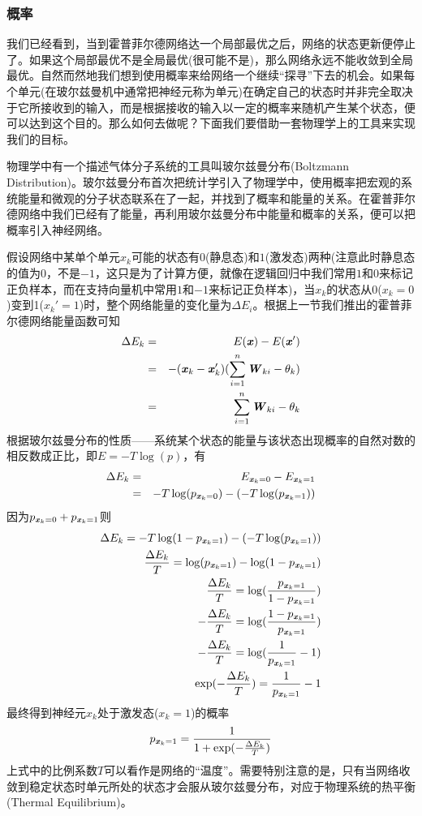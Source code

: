 \subsubsection{概率}
我们已经看到，当到霍普菲尔德网络达一个局部最优之后，网络的状态更新便停止了。如果这个局部最优不是全局最优(很可能不是)，那么网络永远不能收敛到全局最优。自然而然地我们想到使用概率来给网络一个继续“探寻”下去的机会。如果每个单元(在玻尔兹曼机中通常把神经元称为单元)在确定自己的状态时并非完全取决于它所接收到的输入，而是根据接收的输入以一定的概率来随机产生某个状态，便可以达到这个目的。那么如何去做呢？下面我们要借助一套物理学上的工具来实现我们的目标。

物理学中有一个描述气体分子系统的工具叫玻尔兹曼分布(Boltzmann Distribution)。玻尔兹曼分布首次把统计学引入了物理学中，使用概率把宏观的系统能量和微观的分子状态联系在了一起，并找到了概率和能量的关系。在霍普菲尔德网络中我们已经有了能量，再利用玻尔兹曼分布中能量和概率的关系，便可以把概率引入神经网络。

假设网络中某单个单元$x_{k}$可能的状态有$0$(静息态)和$1$(激发态)两种(注意此时静息态的值为$0$，不是$-1$，这只是为了计算方便，就像在逻辑回归中我们常用$1$和$0$来标记正负样本，而在支持向量机中常用$1$和$-1$来标记正负样本)，当$x_{k}$的状态从0($x_{k}=0$)变到1($x_{k}'=1$)时，整个网络能量的变化量为$\Delta E_{i}$。根据上一节我们推出的霍普菲尔德网络能量函数可知
\begin{eqnarray}
\Delta E_{k} 
&=& E(\boldsymbol{\mathit{x}}) - E(\boldsymbol{\mathit{x}}') \nonumber\\
&=& -(\boldsymbol{\mathit{x}}_{k} - \boldsymbol{\mathit{x}}_{k}')(\sum_{i=1}^{n}\boldsymbol{\mathit{W}}_{ki} - \theta_{k}) \nonumber\\
&=& \sum_{i=1}^{n}\boldsymbol{\mathit{W}}_{ki} - \theta_{k}
\end{eqnarray}
根据玻尔兹曼分布的性质——系统某个状态的能量与该状态出现概率的自然对数的相反数成正比，即$E=-T\log(p)$，有
\begin{eqnarray}
\Delta E_{k} 
&=& E_{\boldsymbol{\mathit{x}}_{k}=0} - E_{\boldsymbol{\mathit{x}}_{k}=1} \nonumber\\
&=& -T\log (p_{\boldsymbol{\mathit{x}}_{k}=0}) - (-T\log (p_{\boldsymbol{\mathit{x}}_{k}=1}))\nonumber
\end{eqnarray}
因为$p_{\boldsymbol{\mathit{x}}_{k}=0}+p_{\boldsymbol{\mathit{x}}_{k}=1}$则
\begin{eqnarray}
\Delta E_{k} = -T\log (1-p_{\boldsymbol{\mathit{x}}_{k}=1}) - (-T\log (p_{\boldsymbol{\mathit{x}}_{k}=1}))\nonumber \\
\frac{\Delta E_{k}}{T} = \log (p_{\boldsymbol{\mathit{x}}_{k}=1}) - \log (1-p_{\boldsymbol{\mathit{x}}_{k}=1})\nonumber \\
\frac{\Delta E_{k}}{T} = \log (\frac{p_{\boldsymbol{\mathit{x}}_{k}=1}}{1-p_{\boldsymbol{\mathit{x}}_{k}=1}})\nonumber \\
-\frac{\Delta E_{k}}{T} = \log (\frac{1-p_{\boldsymbol{\mathit{x}}_{k}=1}}{p_{\boldsymbol{\mathit{x}}_{k}=1}})\nonumber \\
-\frac{\Delta E_{k}}{T} = \log (\frac{1}{p_{\boldsymbol{\mathit{x}}_{k}=1}}-1)\nonumber \\
\exp(-\frac{\Delta E_{k}}{T}) = \frac{1}{p_{\boldsymbol{\mathit{x}}_{k}=1}}-1\nonumber \\
\end{eqnarray}
最终得到神经元$x_{k}$处于激发态($x_{k}=1$)的概率
\begin{eqnarray}
p_{\boldsymbol{\mathit{x}}_{k}=1} = \frac{1}{1+\exp (-\frac{\Delta E_{k}}{T})}
\end{eqnarray}
上式中的比例系数$T$可以看作是网络的“温度”。需要特别注意的是，只有当网络收敛到稳定状态时单元所处的状态才会服从玻尔兹曼分布，对应于物理系统的热平衡(Thermal Equilibrium)。

